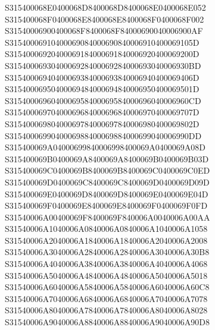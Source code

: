 \documentclass[12pt,a4paper]{article}
\begin{document}
\begin{framed}
{S315400068E0400068D8400068D8400068E0400068E052\newline
S315400068F0400068E8400068E8400068F0400068F002\newline
S31540006900400068F8400068F84000690040006900AF\newline
S31540006910400069084000690840006910400069105D\newline
S31540006920400069184000691840006920400069200D\newline
S3154000693040006928400069284000693040006930BD\newline
S31540006940400069384000693840006940400069406D\newline
S31540006950400069484000694840006950400069501D\newline
S3154000696040006958400069584000696040006960CD\newline
S31540006970400069684000696840006970400069707D\newline
S31540006980400069784000697840006980400069802D\newline
S3154000699040006988400069884000699040006990DD\newline
S315400069A04000699840006998400069A0400069A08D\newline
S315400069B0400069A8400069A8400069B0400069B03D\newline
S315400069C0400069B8400069B8400069C0400069C0ED\newline
S315400069D0400069C8400069C8400069D0400069D09D\newline
S315400069E0400069D8400069D8400069E0400069E04D\newline
S315400069F0400069E8400069E8400069F0400069F0FD\newline
S31540006A00400069F8400069F840006A0040006A00AA\newline
S31540006A1040006A0840006A0840006A1040006A1058\newline
S31540006A2040006A1840006A1840006A2040006A2008\newline
S31540006A3040006A2840006A2840006A3040006A30B8\newline
S31540006A4040006A3840006A3840006A4040006A4068\newline
S31540006A5040006A4840006A4840006A5040006A5018\newline
S31540006A6040006A5840006A5840006A6040006A60C8\newline
S31540006A7040006A6840006A6840006A7040006A7078\newline
S31540006A8040006A7840006A7840006A8040006A8028\newline
S31540006A9040006A8840006A8840006A9040006A90D8\newline
}
\end{framed}
\end{document}
